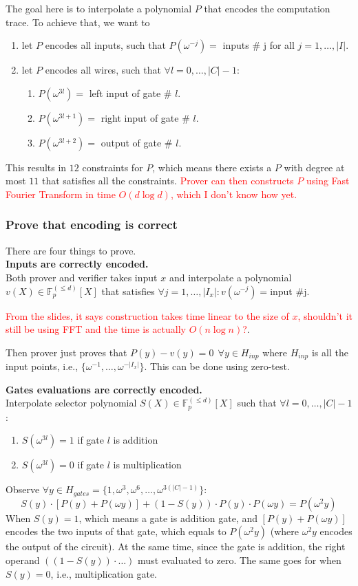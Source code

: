 \documentclass[10pt]{article}
\newcommand{\FFamily}{\mathbb{F}^{(\leq d)}_p[X]}
\newcommand{\HL}[1]{\textcolor{red}{#1}}
\begin{document}
The goal here is to interpolate a polynomial $P$ that encodes the computation
trace. To achieve that, we want to
\begin{enumerate}
    \item let $P$ encodes all inputs, such that $P(\omega^{-j}) =$ inputs \# j
        for all $j = 1, \ldots, |I|$.
    \item let $P$ encodes all wires, such that $\forall l = 0, \ldots, |C|-1$:
        \begin{enumerate}
            \item $P(\omega^{3l}) = $ left input of gate \# $l$.
            \item $P(\omega^{3l+1}) = $ right input of gate \# $l$.
            \item $P(\omega^{3l+2}) = $ output of gate \# $l$.
        \end{enumerate}
\end{enumerate}
This results in $12$ constraints for $P$, which means there exists a $P$ with
degree at most $11$ that satisfies all the constraints. \HL{Prover can then 
constructs $P$ using Fast Fourier Transform in time $O(d\log d)$, which
I don't know how yet.}

\subsubsection{Prove that encoding is correct}
There are four things to prove.\\

\textbf{Inputs are correctly encoded.}\\
Both prover and verifier takes input $x$ and interpolate a polynomial $v(X) \in
\FFamily$ that satisfies $\forall j = 1, \ldots, |I_x|: v(\omega^{-j}) = $input \#j.

\HL{From the slides, it says construction takes time linear to the size of $x$, shouldn't
it still be using FFT and the time is actually $O(n \log n)$?}. 

Then prover just proves that $P(y) - v(y) = 0\ \ \forall y \in H_{inp}$ where
$H_{inp}$ is all the input points, i.e., $\{\omega^{-1}, \ldots,
\omega^{-|I_x|}\}$. This can be done using zero-test.

\textbf{Gates evaluations are correctly encoded.}\\
Interpolate selector polynomial $S(X) \in \FFamily$ such that $\forall l =
0,\ldots, |C| - 1$:
\begin{enumerate}
    \item $S(\omega^{3l}) = 1$ if gate $l$ is addition
    \item $S(\omega^{3l}) = 0$ if gate $l$ is multiplication
\end{enumerate}
Observe $\forall y \in H_{gates} = \{1, \omega^{3}, \omega^{6}, \ldots,
\omega^{3(|C|-1)}\}$:
$$
S(y) \cdot [P(y) + P(\omega y)] + (1 - S(y))\cdot P(y)\cdot P(\omega y) =
P(\omega^{2}y)
$$
When $S(y) = 1$, which means a gate is addition gate, and $[P(y) + P(\omega y)]$
encodes the two inputs of that gate, which equals to $P(\omega^{2}y)$ (where $\omega^2y$ encodes the output of the circuit). 
At the same time, since the gate is addition, the right operand $((1 -
S(y))\cdot \ldots)$ must evaluated to zero. The same goes for when $S(y) = 0$,
i.e., multiplication gate.
\end{document}
